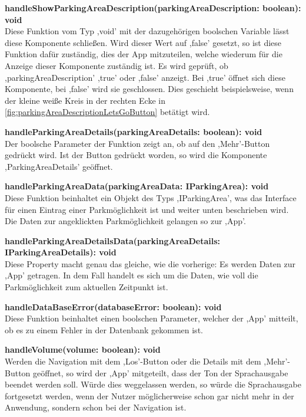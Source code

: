 \begin{description}
\begin{figure}[h!]
		\label{fig:parkingAreaDescriptionLetsGoButton}
	\end{figure}
	\item \textbf{handleShowParkingAreaDescription(parkingAreaDescription: boolean): void} \\ Diese Funktion vom Typ ,void' mit der dazugehörigen boolschen Variable lässt diese Komponente schließen. Wird dieser Wert auf ,false' gesetzt, so ist diese Funktion dafür zuständig, dies der App mitzuteilen, welche wiederum für die Anzeige dieser Komponente zuständig ist. Es wird geprüft, ob ,parkingAreaDescription' ,true' oder ,false' anzeigt. Bei ,true' öffnet sich diese Komponente, bei ,false' wird sie geschlossen. Dies geschieht beispielsweise, wenn der kleine weiße Kreis in der rechten Ecke in \autoref{fig:parkingAreaDescriptionLetsGoButton} betätigt wird.
	\item \textbf{handleParkingAreaDetails(parkingAreaDetails: boolean): void} \\ Der boolsche Parameter der Funktion zeigt an, ob auf den ,Mehr'-Button gedrückt wird. Ist der Button gedrückt worden, so wird die Komponente ,ParkingAreaDetails' geöffnet.
	\item \textbf{handleParkingAreaData(parkingAreaData: IParkingArea): void} \\ Diese Funktion beinhaltet ein Objekt des Typs ,IParkingArea', was das Interface für einen Eintrag einer Parkmöglichkeit ist und weiter unten beschrieben wird. Die Daten zur angeklickten Parkmöglichkeit gelangen so zur ,App'.
	\newpage
	\item \textbf{handleParkingAreaDetailsData(parkingAreaDetails: IParkingAreaDetails): void} \\ Diese Property macht genau das gleiche, wie die vorherige: Es werden Daten zur ,App' getragen. In dem Fall handelt es sich um die Daten, wie voll die Parkmöglichkeit zum aktuellen Zeitpunkt ist.
	\item \textbf{handleDataBaseError(databaseError: boolean): void} \\ Diese Funktion beinhaltet einen boolschen Parameter, welcher der ,App' mitteilt, ob es zu einem Fehler in der Datenbank gekommen ist.
	\item \textbf{handleVolume(volume: boolean): void} \\ Werden die Navigation mit dem ,Los'-Button oder die Details mit dem ,Mehr'-Button geöffnet, so wird der ,App' mitgeteilt, dass der Ton der Sprachausgabe beendet werden soll. Würde dies weggelassen werden, so würde die Sprachausgabe fortgesetzt werden, wenn der Nutzer möglicherweise schon gar nicht mehr in der Anwendung, sondern schon bei der Navigation ist.
\end{description}

